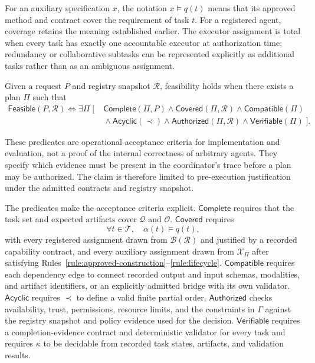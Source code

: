 For an auxiliary specification $x$, the notation $x \models q(t)$ means that its approved method and contract cover the requirement of task $t$. For a registered agent, coverage retains the meaning established earlier. The executor assignment is total when every task has exactly one accountable executor at authorization time; redundancy or collaborative subtasks can be represented explicitly as additional tasks rather than as an ambiguous assignment.

\begin{definition}[Feasibility]
\label{def:feasibility}
Given a request $P$ and registry snapshot $\mathcal{R}$, feasibility holds when there exists a plan $\Pi$ such that
\[
\begin{aligned}
\mathsf{Feasible}(P,\mathcal{R}) \Longleftrightarrow \exists \Pi\;[\;&
\mathsf{Complete}(\Pi,P) \land
\mathsf{Covered}(\Pi,\mathcal{R}) \land
\mathsf{Compatible}(\Pi) \\
&{}\land \mathsf{Acyclic}(\prec) \land
\mathsf{Authorized}(\Pi,\mathcal{R}) \land
\mathsf{Verifiable}(\Pi)\;].
\end{aligned}
\]
\end{definition}

These predicates are operational acceptance criteria for implementation and evaluation, not a proof of the internal correctness of arbitrary agents. They specify which evidence must be present in the coordinator's trace before a plan may be authorized. The claim is therefore limited to pre-execution justification under the admitted contracts and registry snapshot.

The predicates make the acceptance criteria explicit. $\mathsf{Complete}$ requires that the task set and expected artifacts cover $\mathcal{Q}$ and $\mathcal{O}$. $\mathsf{Covered}$ requires
\[
\forall t \in \mathcal{T},\quad
\alpha(t) \models q(t),
\]
with every registered assignment drawn from $\mathcal{B}(\mathcal{R})$ and justified by a recorded capability contract, and every auxiliary assignment drawn from $\mathcal{X}_{\Pi}$ after satisfying Rules~\ref{rule:approved-construction}--\ref{rule:lifecycle}. $\mathsf{Compatible}$ requires each dependency edge to connect recorded output and input schemas, modalities, and artifact identifiers, or an explicitly admitted bridge with its own validator. $\mathsf{Acyclic}$ requires $\prec$ to define a valid finite partial order. $\mathsf{Authorized}$ checks availability, trust, permissions, resource limits, and the constraints in $\Gamma$ against the registry snapshot and policy evidence used for the decision. $\mathsf{Verifiable}$ requires a completion-evidence contract and deterministic validator for every task and requires $\kappa$ to be decidable from recorded task states, artifacts, and validation results.

